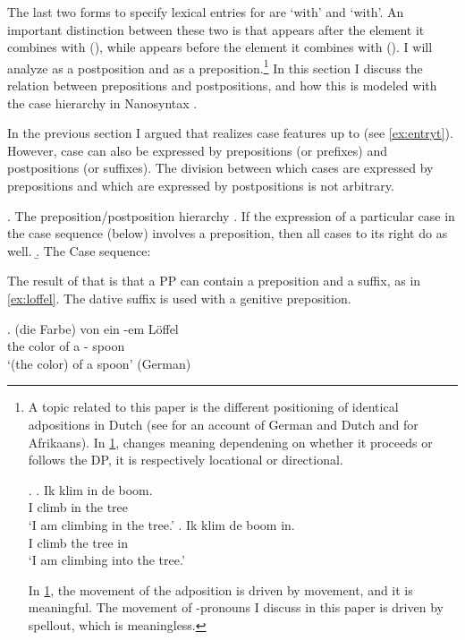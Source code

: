 \documentclass[12pt]{article}
\begin{document}
The last two forms to specify lexical entries for are  `with' and  `with'. An important distinction between these two is that  appears after the element it combines with (), while  appears before the element it combines with (). I will analyze  as a postposition and  as a preposition.\footnote{A topic related to this paper is the different positioning of identical adpositions in Dutch (see \citet{caha2010} for an account of German and Dutch and \citet{pretorius2017} for Afrikaans). In \ref{ex:dutchin},  changes meaning dependening on whether it proceeds or follows the DP, it is respectively locational or directional.

\ex.\label{ex:dutchin}
\ag. Ik klim in de boom.\\
 I climb in the tree\\
 `I am climbing in the tree.'
\bg. Ik klim de boom in.\\
 I climb the tree in\\
 `I am climbing into the tree.'

In \ref{ex:dutchin}, the movement of the adposition is driven by movement, and it is meaningful. The movement of -pronouns I discuss in this paper is driven by spellout, which is meaningless.} In this section I discuss the relation between prepositions and postpositions, and how this is modeled with the case hierarchy in Nanosyntax \citep{caha2009}.

In the previous section I argued that  realizes case features up to  (see \ref{ex:entryt}). However, case can also be expressed by prepositions (or prefixes) and postpositions (or suffixes). The division between which cases are expressed by prepositions and which are expressed by postpositions is not arbitrary.

\ex. The preposition/postposition hierarchy
\a. If the expression of a particular case in the case sequence (below) involves a preposition, then all cases to its right do as well.
\b. The Case sequence:  \hfill \citep{caha2009}

The result of that is that a PP can contain a preposition and a suffix, as in \ref{ex:loffel}. The dative suffix is used with a genitive preposition.

\exg. (die Farbe) von ein -em Löffel\\
the color of a - spoon\\
`(the color) of a spoon' \hfill (German)\label{ex:loffel}
\end{document}
